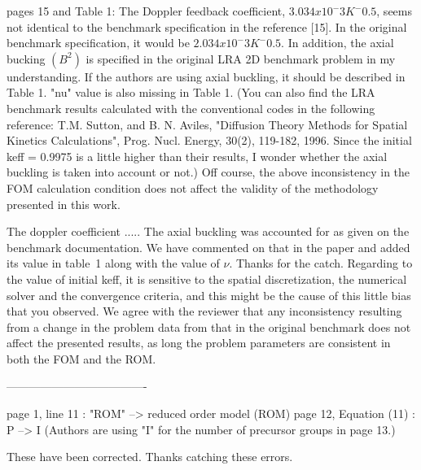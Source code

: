 \documentclass[10pt]{article}
\begin{document}
\begin{response}
{ pages 15 and Table 1:
	The Doppler feedback coefficient, $3.034x10^-3 K^-0.5$, seems not identical to the benchmark specification in the reference [15]. In the original benchmark specification, it would be $2.034x10^-3 K^-0.5$.
	In addition, the axial bucking $(B^2)$ is specified in the original LRA 2D benchmark problem in my understanding. If the authors are using axial buckling, it should be described in Table 1. "nu" value is also missing in Table 1.
	(You can also find the LRA benchmark results calculated with the conventional codes in the following reference:
	T.M. Sutton, and B. N. Aviles, "Diffusion Theory Methods for Spatial Kinetics Calculations", Prog. Nucl. Energy, 30(2), 119-182, 1996.
	Since the initial keff = 0.9975 is a little higher than their results, I wonder whether the axial buckling is taken into account or not.)
	Off course, the above inconsistency in the FOM calculation condition does not affect the validity of the methodology presented in this work.}


The doppler coefficient .....
The axial buckling was accounted for as given on the benchmark documentation. We have commented on that in the paper and added its value in table~1 along with the value of $\nu$. Thanks for the catch.
Regarding to the value of initial keff, it is sensitive to the spatial discretization, the numerical solver and the convergence criteria, and this might be the cause of this little bias that you observed.
We agree with the reviewer that any inconsistency resulting from a change in the problem data from that in the original benchmark does not affect the presented results, as long the problem parameters are consistent in both the FOM and the ROM. 


-------------------------------------
\end{response}

\begin{response}
{
 page 1, line 11 : "ROM" --> reduced order model (ROM)
 page 12, Equation (11) : P --> I (Authors are using "I" for the number of precursor groups in page 13.)}

\end{response}
These have been corrected. Thanks catching these errors.
\end{document}
